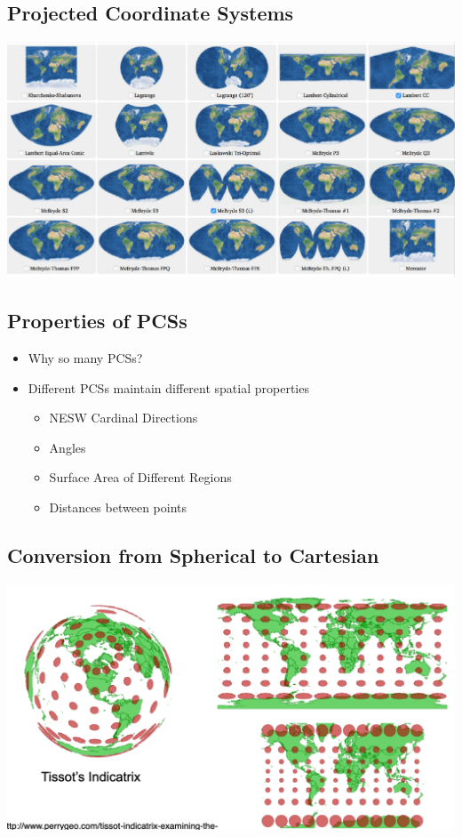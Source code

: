\documentclass[11pt]{article}
\theoremstyle{definition}
\begin{document}
\subsection{Projected Coordinate Systems}

\includegraphics[width=\textwidth/2]{11.png}

\subsection{Properties of PCSs}
\begin{itemize}
    \item Why so many PCSs?
    \item Different PCSs maintain different spatial
    properties
    \begin{itemize}
        \item NESW Cardinal Directions
        \item Angles
        \item Surface Area of Different Regions
        \item Distances between points
    \end{itemize}
\end{itemize}

\subsection{Conversion from Spherical to
Cartesian}

\includegraphics[width=\textwidth/2]{12.png}
\end{document}
